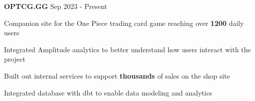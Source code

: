 



\begin{cventries}


\cventry
{\textbf{OPTCG.GG }\href{https://optcg.gg}{\faShareSquare}}
{Sep 2023 - Present} %
{ %
\begin{cvitems}
\item {Companion site for the One Piece trading card game reaching over \textbf{1200} daily users}
\item {Integrated Amplitude analytics to better understand how users interact with the project}
\item {Built out internal services to support \textbf{thousands} of sales on the shop site}
\item {Integrated database with dbt to enable data modeling and analytics}
\end{cvitems}
}





\end{cventries}
